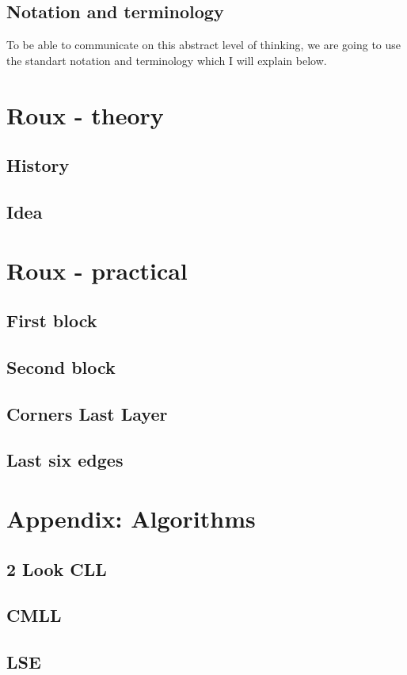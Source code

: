 \documentclass{scrreprt}
\begin{document}
\section{Notation and terminology}
To be able to communicate on this abstract level of thinking, we are going to use the standart notation and terminology which I will explain below.

\chapter{Roux - theory}

\section{History}

\section{Idea}

\chapter{Roux - practical}

\section{First block}

\section{Second block}

\section{Corners Last Layer}

\section{Last six edges}

\chapter{Appendix: Algorithms}

\section{2 Look CLL}

\section{CMLL}

\section{LSE}
\end{document}
